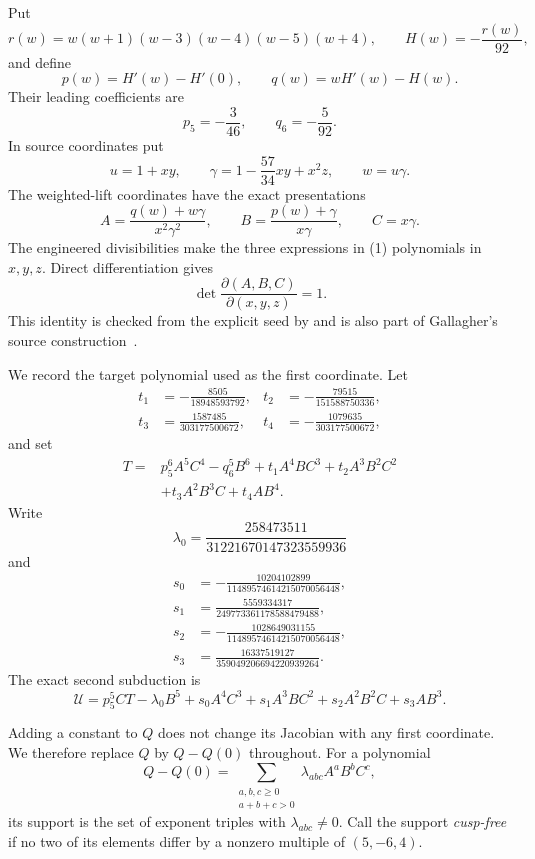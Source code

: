 \documentclass[11pt]{article}
\theoremstyle{remark}
\newcommand{\cU}{\mathcal U}
\begin{document}
Put
\[
 r(w)=w(w+1)(w-3)(w-4)(w-5)(w+4),\qquad
 H(w)=-\frac{r(w)}{92},
\]
and define
\[
 p(w)=H'(w)-H'(0),\qquad q(w)=wH'(w)-H(w).
\]
Their leading coefficients are
\[
 p_5=-\frac3{46},\qquad q_6=-\frac5{92}.
\]
In source coordinates put
\[
 u=1+xy,\qquad
 \gamma=1-\frac{57}{34}xy+x^2z,\qquad
 w=u\gamma .
\]
The weighted-lift coordinates have the exact presentations
\[
 A=\frac{q(w)+w\gamma}{x^2\gamma^2},\qquad
 B=\frac{p(w)+\gamma}{x\gamma},\qquad
 C=x\gamma .
\tag{1}
\]
The engineered divisibilities make the three expressions in (1)
polynomials in \(x,y,z\).  Direct differentiation gives
\[
\det\frac{\partial(A,B,C)}{\partial(x,y,z)}=1.
\]
This identity is checked from the explicit seed by
 and
is also part of Gallagher's source construction~\cite{Gallagher}.

We record the target polynomial used as the first coordinate.  Let
\[
\begin{aligned}
t_1&=-\frac{8505}{18948593792},&
t_2&=-\frac{79515}{151588750336},\\
t_3&=\frac{1587485}{303177500672},&
t_4&=-\frac{1079635}{303177500672},
\end{aligned}
\]
and set
\[
\begin{aligned}
T={}&p_5^6A^5C^4-q_6^5B^6
 +t_1A^4BC^3+t_2A^3B^2C^2\\
&+t_3A^2B^3C+t_4AB^4.
\end{aligned}
\tag{2}
\]
Write
\[
\lambda_0=
\frac{258473511}{31221670147323559936}
\]
and
\[
\begin{aligned}
s_0&=-\frac{10204102899}{11489574614215070056448},\\
s_1&=\frac{5559334317}{249773361178588479488},\\
s_2&=-\frac{1028649031155}{11489574614215070056448},\\
s_3&=\frac{16337519127}{359049206694220939264}.
\end{aligned}
\]
The exact second subduction is
\[
\cU=p_5^5CT-\lambda_0B^5+
s_0A^4C^3+s_1A^3BC^2+s_2A^2B^2C+s_3AB^3.
\tag{3}
\]

Adding a constant to \(Q\) does not change its Jacobian with any first
coordinate.  We therefore replace \(Q\) by \(Q-Q(0)\) throughout.  For
a polynomial
\[
Q-Q(0)=
\sum_{\substack{a,b,c\ge0\\a+b+c>0}}
\lambda_{abc}A^aB^bC^c,
\]
its support is the set of exponent triples with
\(\lambda_{abc}\ne0\).  Call the support \emph{cusp-free} if no two
of its elements differ by a nonzero multiple of \((5,-6,4)\).
\end{document}
